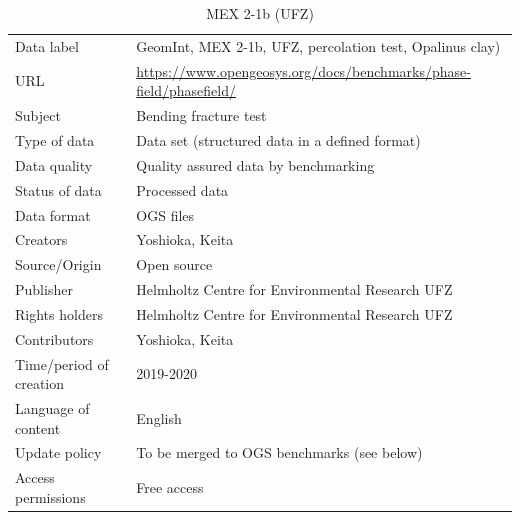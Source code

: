 \begin{table}[!ht]
\caption{MEX 2-1b (UFZ)}
\label{tab:dms-mex2-1a}
\small
\begin{tabular}{R{3.5cm}|L{7.5cm}}
\hline
%
Data label & GeomInt, MEX 2-1b, UFZ, percolation test, Opalinus clay) \\
URL & \url{https://www.opengeosys.org/docs/benchmarks/phase-field/phasefield/} \\ 
Subject  & Bending fracture test \\
Type of data  & Data set (structured data in a defined format) \\
Data quality  & Quality assured data by benchmarking \\
Status of data  & Processed data \\
Data format  & OGS files \\
Creators  & Yoshioka, Keita  \\
Source/Origin & Open source \\
Publisher  & Helmholtz Centre for Environmental Research UFZ \\
Rights holders & Helmholtz Centre for Environmental Research UFZ \\
Contributors & Yoshioka, Keita \\
Time/period of creation & 2019-2020 \\
Language of content & English \\
Update policy & To be merged to OGS benchmarks (see below) \\
Access permissions & Free access \\
%
\hline
\end{tabular}
\end{table}
